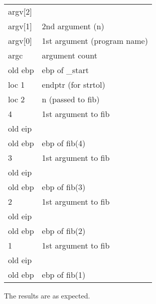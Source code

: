 \documentclass[12pt,a4paper]{article}
\begin{document}
\begin{tabular}{l l}
argv[2] &                                   \\
argv[1] &       2nd argument (n)            \\
argv[0] &       1st argument (program name) \\
argc    &       argument count              \\
old ebp &       ebp of \_start              \\
loc 1   &       endptr (for strtol)         \\
loc 2   &       n (passed to fib)           \\
4       &       1st argument to fib         \\
old eip &                                   \\
old ebp &       ebp of fib(4)               \\
3       &       1st argument to fib         \\
old eip &                                   \\
old ebp &       ebp of fib(3)               \\
2       &       1st argument to fib         \\
old eip &                                   \\
old ebp &       ebp of fib(2)               \\
1       &       1st argument to fib         \\
old eip &                                   \\
old ebp &       ebp of fib(1)               \\
\end{tabular}

The results are as expected.
\end{document}
